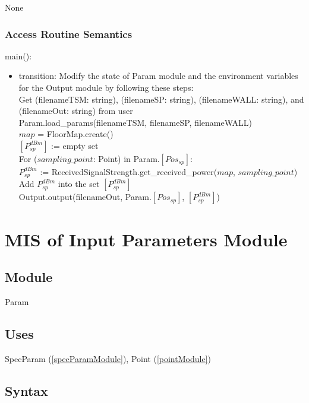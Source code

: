 \documentclass[12pt, titlepage]{article}
\begin{document}
None

\subsubsection{Access Routine Semantics}

\noindent main():
\begin{itemize}
\item transition: Modify the state of Param module and the environment variables for the
Output module by following these steps:\\

	Get (filenameTSM: string), (filenameSP: string), (filenameWALL: string), and (filenameOut: string) from user\\
	
	Param.load\_params(filenameTSM, filenameSP, filenameWALL)\\
	
	$map$ = FloorMap.create()\\
	
	$[P_{sp}^{dBm}]$ := empty set\\
	For ($sampling\_point$: Point) in Param.$[Pos_{sp}]$:\\
	$P_{sp}^{dBm}$ := ReceivedSignalStrength.get\_received\_power($map$, $sampling\_point$)\\
	Add $P_{sp}^{dBm}$ into the set $[P_{sp}^{dBm}]$\\
	
	Output.output(filenameOut, Param.$[Pos_{sp}]$, $[P_{sp}^{dBm}]$)
\end{itemize}

\newpage


\section{MIS of Input Parameters Module} \label{inputParamModule}

\subsection{Module}

Param

\subsection{Uses}

SpecParam (\autoref{specParamModule}), Point (\autoref{pointModule})

\subsection{Syntax}
\end{document}
